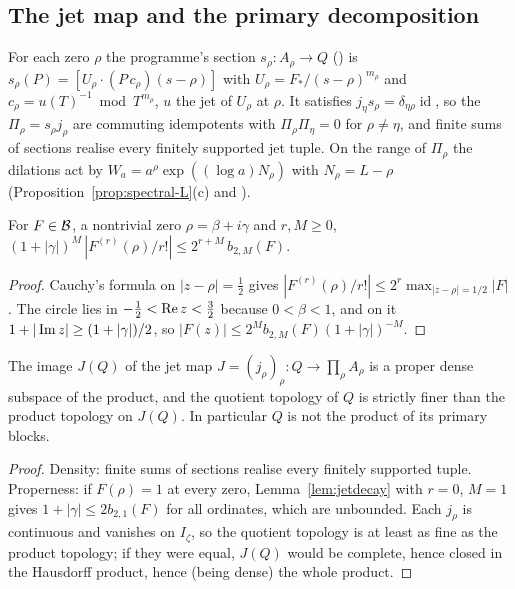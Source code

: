 \subsection{The jet map and the primary decomposition}

For each zero $\rho$ the programme's section $s_\rho:A_\rho\to Q$ () is $s_\rho(P)=[U_\rho\cdot(P\,c_\rho)(s-\rho)]$ with $U_\rho=F_*/(s-\rho)^{m_\rho}$ and $c_\rho=u(T)^{-1}\bmod T^{m_\rho}$, $u$ the jet of $U_\rho$ at $\rho$.
It satisfies $j_\eta s_\rho=\delta_{\eta\rho}\operatorname{id}$, so the $\Pi_\rho=s_\rho j_\rho$ are commuting idempotents with $\Pi_\rho\Pi_\eta=0$ for $\rho\ne\eta$, and finite sums of sections realise every finitely supported jet tuple.
On the range of $\Pi_\rho$ the dilations act by $W_a=a^\rho\exp((\log a)N_\rho)$ with $N_\rho=L-\rho$ (Proposition~\ref{prop:spectral-L}(c) and ).

\begin{lemma}\label{lem:jetdecay}
For $F\in\mathcal{B}$, a nontrivial zero $\rho=\beta+i\gamma$ and $r,M\ge0$,
\(
(1+|\gamma|)^M\,|F^{(r)}(\rho)/r!|\le2^{r+M}\,b_{2,M}(F).
\)
\end{lemma}

\begin{proof}
Cauchy's formula on $|z-\rho|=\tfrac12$ gives $|F^{(r)}(\rho)/r!|\le2^r\max_{|z-\rho|=1/2}|F|$. The circle lies in $-\tfrac12<\operatorname{Re} z<\tfrac32$ because $0<\beta<1$, and on it $1+|\operatorname{Im} z|\ge(1+|\gamma|)/2$, so $|F(z)|\le2^Mb_{2,M}(F)(1+|\gamma|)^{-M}$.
\end{proof}

\begin{corollary}\label{cor:jetimage}
The image $J(Q)$ of the jet map $J=(j_\rho)_\rho:Q\to\prod_\rho A_\rho$ is a proper dense subspace of the product, and the quotient topology of $Q$ is strictly finer than the product topology on $J(Q)$. In particular $Q$ is not the product of its primary blocks.
\end{corollary}

\begin{proof}
Density: finite sums of sections realise every finitely supported tuple. Properness: if $F(\rho)=1$ at every zero, Lemma~\ref{lem:jetdecay} with $r=0$, $M=1$ gives $1+|\gamma|\le2b_{2,1}(F)$ for all ordinates, which are unbounded.
Each $j_\rho$ is continuous and vanishes on $I_\zeta$, so the quotient topology is at least as fine as the product topology; if they were equal, $J(Q)$ would be complete, hence closed in the Hausdorff product, hence (being dense) the whole product.
\end{proof}

